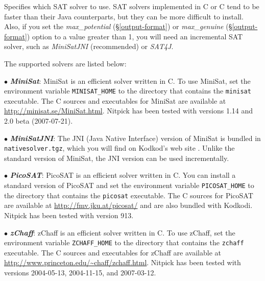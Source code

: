 \documentclass[a4paper,12pt]{article}
\begin{document}
\def\cpp{C\nobreak\raisebox{.1ex}{+}\nobreak\raisebox{.1ex}{+}}

\sloppy

\begin{enum}
Specifies which SAT solver to use. SAT solvers implemented in C or \cpp{} tend
to be faster than their Java counterparts, but they can be more difficult to
install. Also, if you set the \textit{max\_potential} (\S\ref{output-format}) or
\textit{max\_genuine} (\S\ref{output-format}) option to a value greater than 1,
you will need an incremental SAT solver, such as \textit{MiniSatJNI}
(recommended) or \textit{SAT4J}.

The supported solvers are listed below:

\begin{enum}

\item[$\bullet$] \textbf{\textit{MiniSat}}: MiniSat is an efficient solver
written in \cpp{}. To use MiniSat, set the environment variable
\texttt{MINISAT\_HOME} to the directory that contains the \texttt{minisat}
executable. The \cpp{} sources and executables for MiniSat are available at
\url{http://minisat.se/MiniSat.html}. Nitpick has been tested with versions 1.14
and 2.0 beta (2007-07-21).

\item[$\bullet$] \textbf{\textit{MiniSatJNI}}: The JNI (Java Native Interface)
version of MiniSat is bundled in \texttt{nativesolver.\allowbreak tgz}, which
you will find on Kodkod's web site \cite{kodkod-2009}. Unlike the standard
version of MiniSat, the JNI version can be used incrementally.

\item[$\bullet$] \textbf{\textit{PicoSAT}}: PicoSAT is an efficient solver
written in C. You can install a standard version of
PicoSAT and set the environment variable \texttt{PICOSAT\_HOME} to the directory
that contains the \texttt{picosat} executable. The C sources for PicoSAT are
available at \url{http://fmv.jku.at/picosat/} and are also bundled with Kodkodi.
Nitpick has been tested with version 913.

\item[$\bullet$] \textbf{\textit{zChaff}}: zChaff is an efficient solver written
in \cpp{}. To use zChaff, set the environment variable \texttt{ZCHAFF\_HOME} to
the directory that contains the \texttt{zchaff} executable. The \cpp{} sources
and executables for zChaff are available at
\url{http://www.princeton.edu/~chaff/zchaff.html}. Nitpick has been tested with
versions 2004-05-13, 2004-11-15, and 2007-03-12.


\end{enum}
\end{enum}
\end{document}
